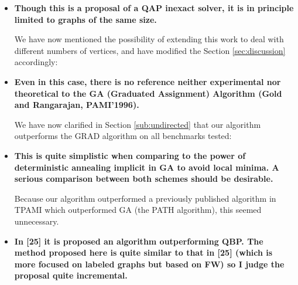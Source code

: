 \begin{itemize}
	\item \textbf{Though this is a proposal of a QAP inexact solver, it is in principle limited to graphs of the same size.}

We have now mentioned the possibility of extending this work to deal with different numbers of vertices, and have modified the Section \ref{sec:discussion} accordingly:


	\item \textbf{Even in this case, there is no reference neither experimental nor theoretical to the GA (Graduated Assignment) Algorithm (Gold and Rangarajan, PAMI'1996). }

We have now clarified in Section \ref{sub:undirected} that our algorithm outperforms the GRAD algorithm on all benchmarks tested:  




	\item \textbf{This is quite simplistic when comparing to the power of deterministic annealing implicit in GA to avoid local minima. A serious comparison between both schemes should be desirable.}

Because our algorithm outperformed a previously published algorithm in TPAMI which outperformed GA (the PATH algorithm), this seemed unnecessary.

	\item \textbf{In [25] it is proposed an algorithm outperforming QBP. The method proposed here is quite similar to that in [25] (which is more focused on labeled graphs but based on FW) so I judge the proposal quite incremental.}


\end{itemize}

